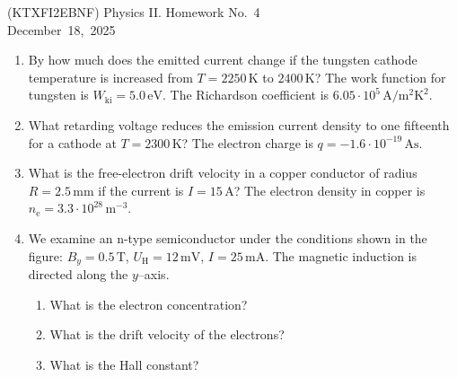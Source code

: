 \documentclass[a4paper,12pt]{letter}
\begin{document}
\begin{center}
  (KTXFI2EBNF) Physics II. Homework No.~4\\ \smallskip
 December~18,~2025
 \end{center}


\begin{enumerate}
  \item By how much does the emitted current change if the tungsten cathode temperature is increased from $T = 2250\,\text{K}$ to $2400\,\text{K}$?  
  The work function for tungsten is $W_{\text{ki}} = 5.0\,\text{eV}$.  
  The Richardson coefficient is $6.05 \cdot 10^{5}\,\text{A}/\text{m}^2\text{K}^2$.

  \item What retarding voltage reduces the emission current density to one fifteenth for a cathode at $T = 2300\,\text{K}$?  
  The electron charge is $q = -1.6 \cdot 10^{-19}\,\text{As}$.

  \item What is the free-electron drift velocity in a copper conductor of radius $R = 2.5\,\text{mm}$ if the current is $I = 15\,\text{A}$?  
  The electron density in copper is $n_{\text{e}} = 3.3 \cdot 10^{28}\,\text{m}^{-3}$.

  \item We examine an n-type semiconductor under the conditions shown in the figure:  
  $B_{y} = 0.5\,\text{T}$, $U_{\text{H}} = 12\,\text{mV}$, $I = 25\,\text{mA}$.  
  The magnetic induction is directed along the $y$–axis.

  \begin{enumerate}
    \item What is the electron concentration?
    \item What is the drift velocity of the electrons?
    \item What is the Hall constant?
  \end{enumerate}

\end{enumerate}

\bigskip


\vfill
\end{document}
